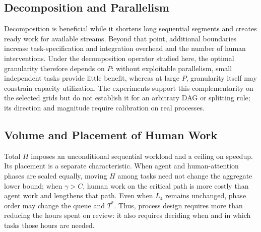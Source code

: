 \subsection{Decomposition and Parallelism}

Decomposition is beneficial while it shortens long sequential segments and
creates ready work for available streams. Beyond that point, additional
boundaries increase task-specification and integration overhead and the number
of human interventions. Under the decomposition operator studied here, the
optimal granularity therefore depends on $P$: without exploitable parallelism,
small independent tasks provide little benefit, whereas at large $P$,
granularity itself may constrain capacity utilization. The experiments support
this complementarity on the selected grids but do not establish it for an
arbitrary DAG or splitting rule; its direction and magnitude require
calibration on real processes.

\subsection{Volume and Placement of Human Work}

Total $H$ imposes an unconditional sequential workload and a ceiling on
speedup. Its placement is a separate characteristic. When agent and
human-attention phases are scaled equally, moving $H$ among tasks need not
change the aggregate lower bound; when $\gamma>C$, human work on the critical
path is more costly than agent work and lengthens that path. Even when $L_4$
remains unchanged, phase order may change the queue and $T^*$. Thus, process
design requires more than reducing the hours spent on review: it also requires
deciding when and in which tasks those hours are needed.
